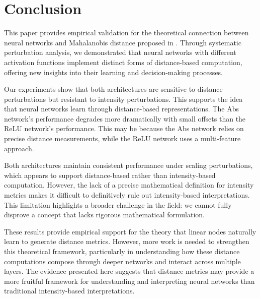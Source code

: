 \section{Conclusion}

This paper provides empirical validation for the theoretical connection between neural networks and Mahalanobis distance proposed in \citep{oursland2024interpreting}. Through systematic perturbation analysis, we demonstrated that neural networks with different activation functions implement distinct forms of distance-based computation, offering new insights into their learning and decision-making processes.

Our experiments show that both architectures are sensitive to distance perturbations but resistant to intensity perturbations. This supports the idea that neural networks learn through distance-based representations. The Abs network's performance degrades more dramatically with small offsets than the ReLU network's performance. This may be because the Abs network relies on precise distance measurements, while the ReLU network uses a multi-feature approach.

Both architectures maintain consistent performance under scaling perturbations, which appears to support distance-based rather than intensity-based computation. However, the lack of a precise mathematical definition for intensity metrics makes it difficult to definitively rule out intensity-based interpretations. This limitation highlights a broader challenge in the field: we cannot fully disprove a concept that lacks rigorous mathematical formulation.

These results provide empirical support for the theory that linear nodes naturally learn to generate distance metrics. However, more work is needed to strengthen this theoretical framework, particularly in understanding how these distance computations compose through deeper networks and interact across multiple layers. The evidence presented here suggests that distance metrics may provide a more fruitful framework for understanding and interpreting neural networks than traditional intensity-based interpretations.
